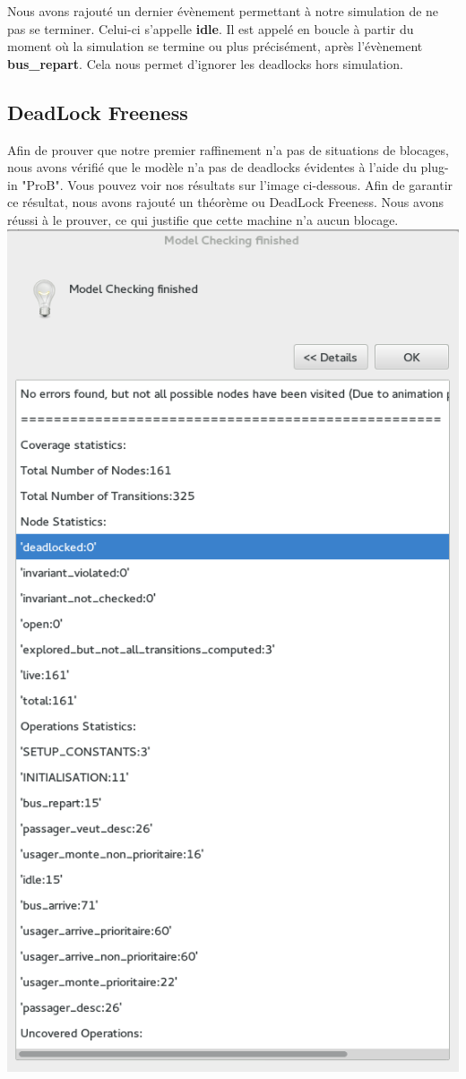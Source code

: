 \documentclass[a4paper,titlepage]{report}
\begin{document}
		Nous avons rajouté un dernier évènement permettant à notre simulation de ne pas se terminer. Celui-ci s'appelle \textbf{idle}. Il est appelé en boucle à partir du moment où la simulation se termine ou plus précisément, après l'évènement \textbf{bus\_repart}. Cela nous permet d'ignorer les deadlocks hors simulation. 
		
		

\subsection{DeadLock Freeness}
	Afin de prouver que notre premier raffinement n'a pas de situations	de blocages, nous avons vérifié que le modèle n'a pas de deadlocks évidentes à l'aide du plug-in "ProB". Vous pouvez voir nos résultats sur l'image ci-dessous. Afin de garantir ce résultat, nous avons rajouté un théorème ou DeadLock Freeness. Nous avons réussi à le prouver, ce qui justifie que cette machine n'a aucun blocage. \\
	
	\includegraphics[scale=0.8]{checkMachineBus1.png}
	
\end{document}
